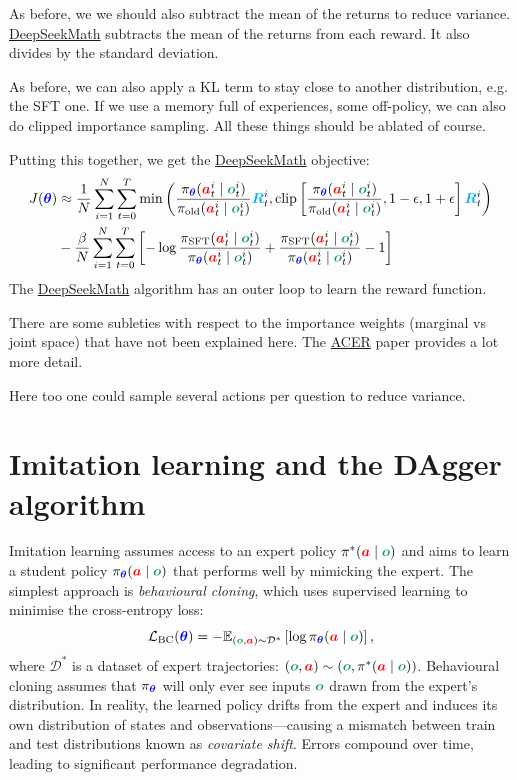 \documentclass{article}
\newcommand{\colsym}[2]{\ensuremath{\textcolor{#1}{\boldsymbol{#2}}}}
\newcommand{\action}{\colsym{red}{a}}
\newcommand{\obs}{\colsym{ForestGreen}{o}}
\newcommand{\params}{\colsym{blue}{\theta}}
\newcommand{\return}{\ensuremath{\textcolor{cyan}{\boldsymbol{R}}}}
\begin{document}
As before, we we should also subtract the mean of the returns to reduce variance. \href{https://arxiv.org/pdf/2402.03300}{DeepSeekMath} subtracts the mean of the returns from each reward. It also divides by the standard deviation.

As before, we can also apply a KL term to stay close to another distribution, e.g. the SFT one. If we use a memory full of experiences, some off-policy, we can also do clipped importance sampling. All these things should be ablated of course.

Putting this together, we get the \href{https://arxiv.org/pdf/2402.03300}{DeepSeekMath} objective:
\begin{align*}
J(\params) &\approx \frac{1}{N} \sum_{i=1}^{N} \sum_{t=0}^T  \min\left(\frac{\pi_{\params}(\action_t^i \mid \obs_t^i)}{\pi_{\text{old}}(\action_t^i \mid \obs_t^i)}  \return_t^i, \text{clip}\left[\frac{\pi_{\params}(\action_t^i \mid \obs_t^i)}{\pi_{\text{old}}(\action_t^i \mid \obs_t^i)}, 1 - \epsilon, 1 + \epsilon\right]  \return_t^i \right)\\
& - \frac{\beta}{N} \sum_{i=1}^N  \sum_{t=0}^T \left[ - \log \frac{\pi_{\text{SFT}}(\action_t^i \mid \obs_t^i)}{\pi_{\params}(\action_t^i \mid \obs_t^i)} + \frac{\pi_{\text{SFT}}(\action_t^i \mid \obs_t^i)}{\pi_{\params}(\action_t^i \mid \obs_t^i)} - 1 \right]
\end{align*}
The \href{https://arxiv.org/pdf/2402.03300}{DeepSeekMath} algorithm has an outer loop to learn the reward function.

There are some subleties with respect to the importance weights (marginal vs joint space) that have not been explained here. The \href{https://arxiv.org/pdf/1611.01224}{ACER} paper provides a lot more detail.

Here too one could sample several actions per question to reduce variance.



\section{Imitation learning and the DAgger algorithm}

Imitation learning assumes access to an expert policy $\pi^*(\action \mid \obs)$ and aims to learn a student policy $\pi_{\params}(\action \mid \obs)$ that performs well by mimicking the expert. The simplest approach is \emph{behavioural cloning}, which uses supervised learning to minimise the cross-entropy loss:
\[
    \mathcal{L}_{\text{BC}}(\params) = - \mathbb{E}_{(\obs,\action) \sim \mathcal{D}^*} \left[ \log \pi_{\params}(\action \mid \obs) \right],
\]
where $\mathcal{D}^*$ is a dataset of expert trajectories: $(\obs, \action) \sim (\obs, \pi^*(\action \mid \obs))$. Behavioural cloning assumes that $\pi_{\params}$ will only ever see inputs $\obs$ drawn from the expert's distribution. In reality, the learned policy drifts from the expert and induces its own distribution of states and observations---causing a mismatch between train and test distributions known as \emph{covariate shift}. Errors compound over time, leading to significant performance degradation.
\end{document}
